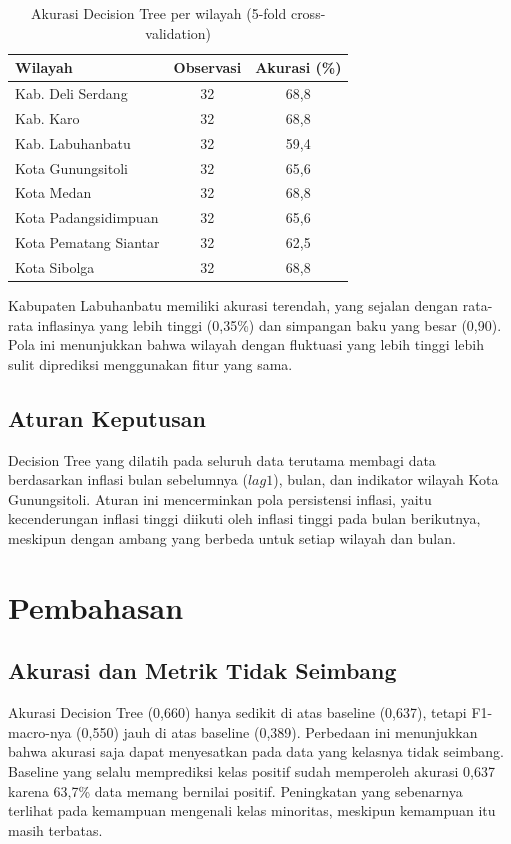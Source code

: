 \documentclass[conference]{IEEEtran}
\begin{document}
\begin{table}[htbp]
\caption{Akurasi Decision Tree per wilayah (5-fold cross-validation)}
\label{tab:wil}
\centering
\begin{tabular}{lcc}
\toprule
Wilayah & Observasi & Akurasi (\%) \\
\midrule
Kab. Deli Serdang & 32 & 68,8 \\
Kab. Karo & 32 & 68,8 \\
Kab. Labuhanbatu & 32 & 59,4 \\
Kota Gunungsitoli & 32 & 65,6 \\
Kota Medan & 32 & 68,8 \\
Kota Padangsidimpuan & 32 & 65,6 \\
Kota Pematang Siantar & 32 & 62,5 \\
Kota Sibolga & 32 & 68,8 \\
\bottomrule
\end{tabular}
\end{table}

Kabupaten Labuhanbatu memiliki akurasi terendah, yang sejalan dengan rata-rata inflasinya yang lebih tinggi (0,35\%) dan simpangan baku yang besar (0,90). Pola ini menunjukkan bahwa wilayah dengan fluktuasi yang lebih tinggi lebih sulit diprediksi menggunakan fitur yang sama.

\subsection{Aturan Keputusan}
Decision Tree yang dilatih pada seluruh data terutama membagi data berdasarkan inflasi bulan sebelumnya ($lag1$), bulan, dan indikator wilayah Kota Gunungsitoli. Aturan ini mencerminkan pola persistensi inflasi, yaitu kecenderungan inflasi tinggi diikuti oleh inflasi tinggi pada bulan berikutnya, meskipun dengan ambang yang berbeda untuk setiap wilayah dan bulan.

\section{Pembahasan}
\subsection{Akurasi dan Metrik Tidak Seimbang}
Akurasi Decision Tree (0,660) hanya sedikit di atas baseline (0,637), tetapi F1-macro-nya (0,550) jauh di atas baseline (0,389). Perbedaan ini menunjukkan bahwa akurasi saja dapat menyesatkan pada data yang kelasnya tidak seimbang. Baseline yang selalu memprediksi kelas positif sudah memperoleh akurasi 0,637 karena 63,7\% data memang bernilai positif. Peningkatan yang sebenarnya terlihat pada kemampuan mengenali kelas minoritas, meskipun kemampuan itu masih terbatas.
\end{document}
